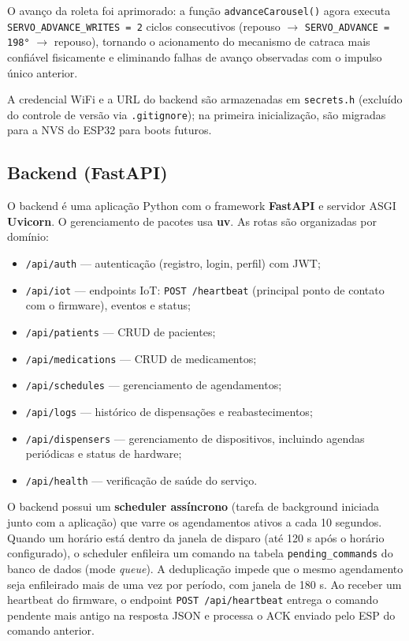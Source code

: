 \documentclass[12pt,a4paper]{article}
\begin{document}
O avanço da roleta foi aprimorado: a função \texttt{advanceCarousel()} agora executa \texttt{SERVO\_ADVANCE\_WRITES~=~2} ciclos consecutivos (repouso $\rightarrow$ \texttt{SERVO\_ADVANCE = 198°} $\rightarrow$ repouso), tornando o acionamento do mecanismo de catraca mais confiável fisicamente e eliminando falhas de avanço observadas com o impulso único anterior.

A credencial WiFi e a URL do backend são armazenadas em \texttt{secrets.h} (excluído do controle de versão via \texttt{.gitignore}); na primeira inicialização, são migradas para a NVS do ESP32 para boots futuros.

\subsection{Backend (FastAPI)}

O backend é uma aplicação Python com o framework \textbf{FastAPI} e servidor ASGI \textbf{Uvicorn}. O gerenciamento de pacotes usa \textbf{uv}. As rotas são organizadas por domínio:

\begin{itemize}
    \item \texttt{/api/auth} — autenticação (registro, login, perfil) com JWT;
    \item \texttt{/api/iot} — endpoints IoT: \texttt{POST /heartbeat} (principal ponto de contato com o firmware), eventos e status;
    \item \texttt{/api/patients} — CRUD de pacientes;
    \item \texttt{/api/medications} — CRUD de medicamentos;
    \item \texttt{/api/schedules} — gerenciamento de agendamentos;
    \item \texttt{/api/logs} — histórico de dispensações e reabastecimentos;
    \item \texttt{/api/dispensers} — gerenciamento de dispositivos, incluindo agendas periódicas e status de hardware;
    \item \texttt{/api/health} — verificação de saúde do serviço.
\end{itemize}

O backend possui um \textbf{scheduler assíncrono} (tarefa de background iniciada junto com a aplicação) que varre os agendamentos ativos a cada 10 segundos. Quando um horário está dentro da janela de disparo (até 120 s após o horário configurado), o scheduler enfileira um comando na tabela \texttt{pending\_commands} do banco de dados (mode \emph{queue}). A deduplicação impede que o mesmo agendamento seja enfileirado mais de uma vez por período, com janela de 180 s. Ao receber um heartbeat do firmware, o endpoint \texttt{POST /api/heartbeat} entrega o comando pendente mais antigo na resposta JSON e processa o ACK enviado pelo ESP do comando anterior.
\end{document}
